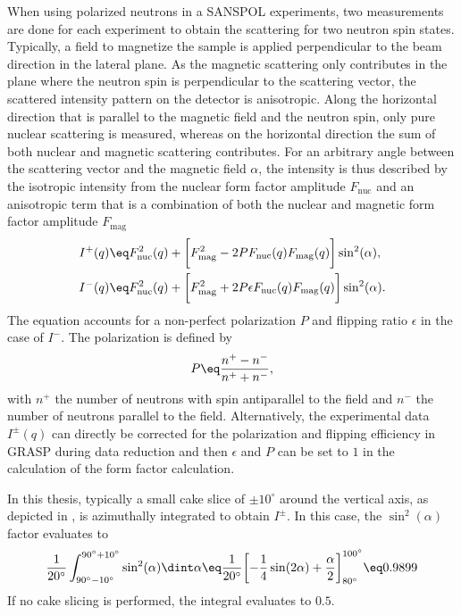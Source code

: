 \documentclass[\main/dresen_thesis.tex]{subfiles}
\begin{document}
    When using polarized neutrons in a SANSPOL experiments, two measurements are done for each experiment to obtain the scattering for two neutron spin states.
    Typically, a field to magnetize the sample is applied perpendicular to the beam direction in the lateral plane.
    As the magnetic scattering only contributes in the plane where the neutron spin is perpendicular to the scattering vector, the scattered intensity pattern on the detector is anisotropic.
    Along the horizontal direction that is parallel to the magnetic field and the neutron spin, only pure nuclear scattering is measured, whereas on the horizontal direction the sum of both nuclear and magnetic scattering contributes.
    For an arbitrary angle between the scattering vector and the magnetic field $\alpha$, the intensity is thus described by the isotropic intensity from the nuclear form factor amplitude $F_\mathrm{nuc}$ and an anisotropic term that is a combination of both the nuclear and magnetic form factor amplitude $F_\mathrm{mag}$ \cite{Wiedenmann_2001_Small, Kohlbrecher_1997_Magne}
    \begin{align}
      \label{eq:methods:sans:sanspolFormula}
      I^+(q)
        &\eq F^2_\mathrm{nuc}(q) + \biggl[ F^2_\mathrm{mag} - 2 P F_\mathrm{nuc}(q) F_\mathrm{mag}(q) \biggr] \sin^2(\alpha),\\
      I^-(q)
        &\eq F^2_\mathrm{nuc}(q) + \biggl[ F^2_\mathrm{mag} + 2 P \epsilon F_\mathrm{nuc}(q) F_\mathrm{mag}(q) \biggr] \sin^2(\alpha).
    \end{align}
    The equation accounts for a non-perfect polarization $P$ and flipping ratio $\epsilon$ in the case of $I^-$.
    The polarization is defined by
    \begin{align}
      P \eq \frac{n^+ - n^-}{n^+ + n^-},
    \end{align}
    with $n^+$ the number of neutrons with spin antiparallel to the field and $n^-$ the number of neutrons parallel to the field.
    Alternatively, the experimental data $I^\pm(q)$ can directly be corrected for the polarization and flipping efficiency in GRASP during data reduction and then $\epsilon$ and $P$ can be set to $1$ in the calculation of the form factor calculation.

    In this thesis, typically a small cake slice of $\pm 10^\circ$ around the vertical axis, as depicted in , is azimuthally integrated to obtain $I^\pm$.
    In this case, the $\sin^2(\alpha)$ factor evaluates to
    \begin{align}
      \frac{1}{20^\circ} \int_{90^\circ-10^\circ}^{90^\circ+10^\circ} \sin^2(\alpha) \dint \alpha \eq
        \frac{1}{20^\circ} \biggl[ -\frac{1}{4}\sin(2\alpha)+\frac{\alpha}{2} \biggr]_{80^\circ}^{100^\circ} \eq
        0.9899
    \end{align}
    If no cake slicing is performed, the integral evaluates to $0.5$.
\end{document}
